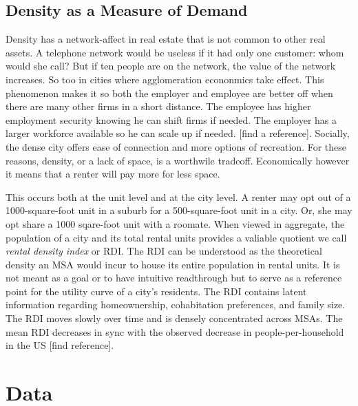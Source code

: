 \documentclass[sn-mathphys-num]{sn-jnl}%
\theoremstyle{thmstyleone}%
\theoremstyle{thmstyletwo}%
\theoremstyle{thmstylethree}%
\begin{document}
\subsection{Density as a Measure of Demand}
Density has a network-affect in real estate that is not common to other real assets. A telephone network would be useless if it had only one customer: whom would she call? But if ten people are on the network, the value of the network increases. So too in cities where agglomeration econonmics take effect. This phenomenon makes it so both the employer and employee are better off when there are many other firms in a short distance. The employee has higher employment security knowing he can shift firms if needed. The employer has a larger workforce available so he can scale up if needed. [find a reference]. Socially, the dense city offers ease of connection and more options of recreation. For these reasons, density, or a lack of space, is a worthwile tradeoff. Economically however it means that a renter will pay more for less space.

This occurs both at the unit level and at the city level. A renter may opt out of a 1000-square-foot unit in a suburb for a 500-square-foot unit in a city. Or, she may opt share a 1000 sqare-foot unit with a roomate. When viewed in aggregate, the population of a city and its total rental units provides a valiable quotient we call \textit{rental density index} or RDI. The RDI can be understood as the theoretical density an MSA would incur to house its entire population in rental units. It is not meant as a goal or to have intuitive readthrough but to serve as a reference point for the utility curve of a city's residents. 
The RDI contains latent information regarding homeownership, cohabitation preferences, and family size. The RDI moves slowly over time and is densely concentrated across MSAs. The mean RDI decreases in sync with the observed decrease in people-per-household in the US [find reference].

\section{Data}
\end{document}
